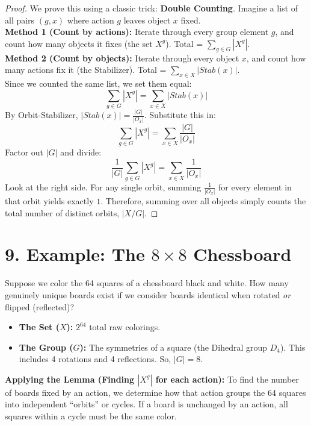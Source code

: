 \documentclass[12pt]{article}
\begin{document}
\begin{proof}
    We prove this using a classic trick: \textbf{Double Counting}. Imagine a list of all pairs $(g, x)$ where action $g$ leaves object $x$ fixed. \\
    \textbf{Method 1 (Count by actions):} Iterate through every group element $g$, and count how many objects it fixes (the set $X^g$). Total = $\sum_{g \in G} |X^g|$. \\
    \textbf{Method 2 (Count by objects):} Iterate through every object $x$, and count how many actions fix it (the Stabilizer). Total = $\sum_{x \in X} |Stab(x)|$. \\
    Since we counted the same list, we set them equal:
    $$ \sum_{g \in G} |X^g| = \sum_{x \in X} |Stab(x)| $$
    By Orbit-Stabilizer, $|Stab(x)| = \frac{|G|}{|O_x|}$. Substitute this in:
    $$ \sum_{g \in G} |X^g| = \sum_{x \in X} \frac{|G|}{|O_x|} $$
    Factor out $|G|$ and divide:
    $$ \frac{1}{|G|} \sum_{g \in G} |X^g| = \sum_{x \in X} \frac{1}{|O_x|} $$
    Look at the right side. For any single orbit, summing $\frac{1}{|O_x|}$ for every element in that orbit yields exactly $1$. Therefore, summing over all objects simply counts the total number of distinct orbits, $|X/G|$.
\end{proof}

\section*{9. Example: The $8 \times 8$ Chessboard}

Suppose we color the 64 squares of a chessboard black and white. How many genuinely unique boards exist if we consider boards identical when rotated \textit{or} flipped (reflected)?

\begin{itemize}
    \item \textbf{The Set ($X$):} $2^{64}$ total raw colorings.
    \item \textbf{The Group ($G$):} The symmetries of a square (the Dihedral group $D_4$). This includes 4 rotations and 4 reflections. So, $|G| = 8$.
\end{itemize}

\textbf{Applying the Lemma (Finding $|X^g|$ for each action):}
To find the number of boards fixed by an action, we determine how that action groups the 64 squares into independent ``orbits'' or cycles. If a board is unchanged by an action, all squares within a cycle must be the same color.
\end{document}
